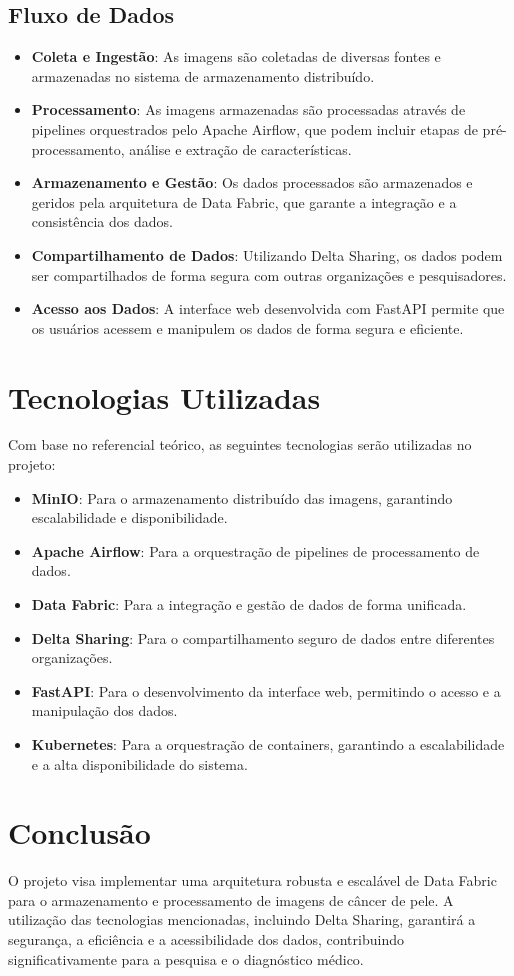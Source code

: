 \subsection{Fluxo de Dados}
\begin{itemize}
    \item \textbf{Coleta e Ingestão}: As imagens são coletadas de diversas fontes e armazenadas no sistema de armazenamento distribuído.
    \item \textbf{Processamento}: As imagens armazenadas são processadas através de pipelines orquestrados pelo Apache Airflow, que podem incluir etapas de pré-processamento, análise e extração de características.
    \item \textbf{Armazenamento e Gestão}: Os dados processados são armazenados e geridos pela arquitetura de Data Fabric, que garante a integração e a consistência dos dados.
    \item \textbf{Compartilhamento de Dados}: Utilizando Delta Sharing, os dados podem ser compartilhados de forma segura com outras organizações e pesquisadores.
    \item \textbf{Acesso aos Dados}: A interface web desenvolvida com FastAPI permite que os usuários acessem e manipulem os dados de forma segura e eficiente.
\end{itemize}

\section{Tecnologias Utilizadas}

Com base no referencial teórico, as seguintes tecnologias serão utilizadas no projeto:
\begin{itemize}
    \item \textbf{MinIO}: Para o armazenamento distribuído das imagens, garantindo escalabilidade e disponibilidade.
    \item \textbf{Apache Airflow}: Para a orquestração de pipelines de processamento de dados.
    \item \textbf{Data Fabric}: Para a integração e gestão de dados de forma unificada.
    \item \textbf{Delta Sharing}: Para o compartilhamento seguro de dados entre diferentes organizações.
    \item \textbf{FastAPI}: Para o desenvolvimento da interface web, permitindo o acesso e a manipulação dos dados.
    \item \textbf{Kubernetes}: Para a orquestração de containers, garantindo a escalabilidade e a alta disponibilidade do sistema.
\end{itemize}

\section{Conclusão}

O projeto visa implementar uma arquitetura robusta e escalável de Data Fabric para o armazenamento e processamento de imagens de câncer de pele. A utilização das tecnologias mencionadas, incluindo Delta Sharing, garantirá a segurança, a eficiência e a acessibilidade dos dados, contribuindo significativamente para a pesquisa e o diagnóstico médico.